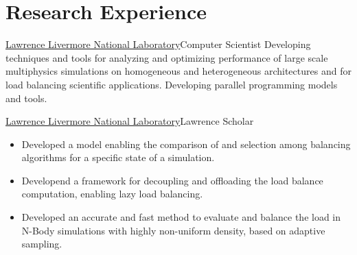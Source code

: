 \section{Research Experience}
		{\href{http://www.llnl.gov}{Lawrence Livermore National Laboratory}}{Computer Scientist}{}{}
		{Developing techniques and tools for analyzing and optimizing performance of large scale multiphysics simulations on homogeneous and heterogeneous architectures and for load balancing scientific applications. Developing parallel programming models and tools.}{}

		{\href{http://www.llnl.gov}{Lawrence Livermore National Laboratory}}{Lawrence Scholar}{}{}
		{\begin{itemize}
            \item Developed a model enabling the comparison of and selection among
                  balancing algorithms for a specific state of a simulation.
            \item Developend a framework for decoupling and offloading the load balance computation,
                  enabling lazy load balancing.
            \item Developed an accurate and fast method to evaluate and balance the load in N-Body simulations
                  with highly non-uniform density, based on adaptive sampling.
		\end{itemize}}

